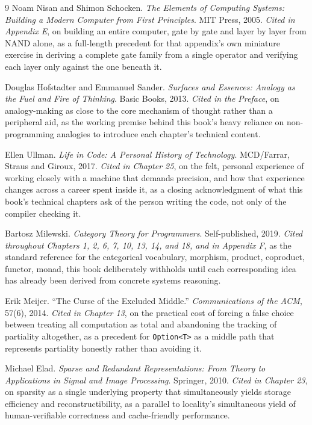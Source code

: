 \documentclass[11pt]{book}
\begin{document}
\begin{thebibliography}{9}
Noam Nisan and Shimon Schocken.
\textit{The Elements of Computing Systems: Building a Modern Computer from First Principles}.
MIT Press, 2005.
\newline\emph{Cited in Appendix E}, on building an entire computer, gate by gate and layer by layer from NAND alone, as a full-length precedent for that appendix's own miniature exercise in deriving a complete gate family from a single operator and verifying each layer only against the one beneath it.

Douglas Hofstadter and Emmanuel Sander.
\textit{Surfaces and Essences: Analogy as the Fuel and Fire of Thinking}.
Basic Books, 2013.
\newline\emph{Cited in the Preface}, on analogy-making as close to the core mechanism of thought rather than a peripheral aid, as the working premise behind this book's heavy reliance on non-programming analogies to introduce each chapter's technical content.

Ellen Ullman.
\textit{Life in Code: A Personal History of Technology}.
MCD/Farrar, Straus and Giroux, 2017.
\newline\emph{Cited in Chapter 25}, on the felt, personal experience of working closely with a machine that demands precision, and how that experience changes across a career spent inside it, as a closing acknowledgment of what this book's technical chapters ask of the person writing the code, not only of the compiler checking it.

Bartosz Milewski.
\textit{Category Theory for Programmers}.
Self-published, 2019.
\newline\emph{Cited throughout Chapters 1, 2, 6, 7, 10, 13, 14, and 18, and in Appendix F}, as the standard reference for the categorical vocabulary, morphism, product, coproduct, functor, monad, this book deliberately withholds until each corresponding idea has already been derived from concrete systems reasoning.

Erik Meijer.
``The Curse of the Excluded Middle.''
\textit{Communications of the ACM}, 57(6), 2014.
\newline\emph{Cited in Chapter 13}, on the practical cost of forcing a false choice between treating all computation as total and abandoning the tracking of partiality altogether, as a precedent for \texttt{Option<T>} as a middle path that represents partiality honestly rather than avoiding it.

Michael Elad.
\textit{Sparse and Redundant Representations: From Theory to Applications in Signal and Image Processing}.
Springer, 2010.
\newline\emph{Cited in Chapter 23}, on sparsity as a single underlying property that simultaneously yields storage efficiency and reconstructibility, as a parallel to locality's simultaneous yield of human-verifiable correctness and cache-friendly performance.

\end{thebibliography}
\end{document}
